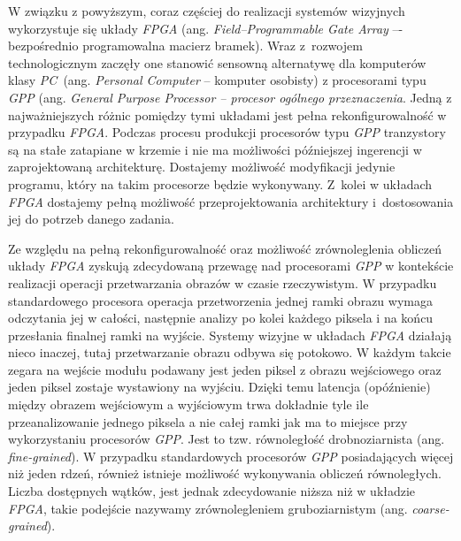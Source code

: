W związku z powyższym, coraz częściej do realizacji systemów wizyjnych wykorzystuje się układy \textit{FPGA} (ang. \textit{Field--Programmable Gate Array} –- bezpośrednio programowalna macierz bramek). 
Wraz z~rozwojem technologicznym zaczęły one stanowić sensowną alternatywę dla komputerów klasy \textit{PC}~(ang. \textit{Personal Computer} -- komputer osobisty) z procesorami typu \textit{GPP} (ang. \textit{General Purpose Processor -- procesor ogólnego przeznaczenia}. 
Jedną z najważniejszych różnic pomiędzy tymi układami jest pełna rekonfigurowalność w przypadku \textit{FPGA}. 
Podczas procesu produkcji procesorów typu \textit{GPP} tranzystory są na stałe zatapiane w krzemie i nie ma możliwości późniejszej ingerencji w zaprojektowaną architekturę.  %
Dostajemy możliwość modyfikacji jedynie programu, który na takim procesorze będzie wykonywany. 
Z~kolei w układach \textit{FPGA} dostajemy pełną możliwość przeprojektowania architektury i~dostosowania jej do potrzeb danego zadania. 

Ze względu na pełną rekonfigurowalność oraz możliwość zrównoleglenia obliczeń układy \textit{FPGA} zyskują zdecydowaną przewagę nad procesorami \textit{GPP} w kontekście realizacji operacji przetwarzania obrazów w czasie rzeczywistym. 
W przypadku standardowego procesora operacja przetworzenia jednej ramki obrazu wymaga odczytania jej w całości, następnie analizy po kolei każdego piksela i na końcu przesłania finalnej ramki na wyjście. 
Systemy wizyjne w układach \textit{FPGA} działają nieco inaczej, tutaj przetwarzanie obrazu odbywa się potokowo. 
W każdym takcie zegara na wejście modułu podawany jest jeden piksel z obrazu wejściowego oraz jeden piksel zostaje wystawiony na wyjściu. Dzięki temu latencja (opóźnienie) między obrazem wejściowym a wyjściowym trwa dokładnie tyle ile przeanalizowanie jednego piksela a nie całej ramki jak ma to miejsce przy wykorzystaniu procesorów \textit{GPP}. Jest to tzw. równoległość drobnoziarnista (ang. \textit{fine-grained}). W przypadku standardowych procesorów \textit{GPP} posiadających więcej niż jeden rdzeń, również istnieje możliwość wykonywania obliczeń równoległych. Liczba dostępnych wątków, jest jednak zdecydowanie niższa niż w układzie \textit{FPGA}, takie podejście nazywamy zrównolegleniem gruboziarnistym (ang. \textit{coarse-grained}). 

